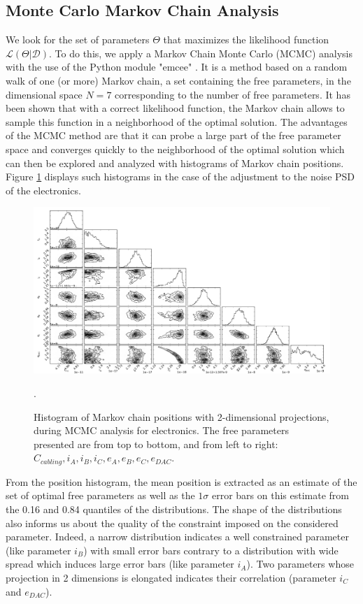 \subsection{Monte Carlo Markov Chain Analysis }
\label{par:mcmc}
\label{sec:ethem-noise}
\label{par:ethem-noise}

We look for the set of parameters $\Theta$ that maximizes the likelihood function $\mathcal{L}(\Theta | \mathcal{D})$. To do this, we apply a Markov Chain Monte Carlo (MCMC) analysis with the use of the Python module "emcee" \cite{2013PASP}.
It is a method based on a random walk of one (or more) Markov chain, a set containing the free parameters, in the dimensional space $N=7$ corresponding to the number of free parameters.
It has been shown that with a correct likelihood function, the Markov chain allows to sample this function in a neighborhood of the optimal solution. The advantages of the MCMC method are that it can probe a large part of the free parameter space and converges quickly to the neighborhood of the optimal solution which can then be explored and analyzed with histograms of Markov chain positions. Figure \ref{fig:triangle-mcmc} displays such histograms in the case of the adjustment to the noise PSD of the \Edelweiss{} electronics.
\begin{figure}
\includegraphics [width=\textwidth]{Figures/Ethem/triangle_fin.pdf}
\caption{Histogram of Markov chain positions with 2-dimensional projections, during MCMC analysis for \Edelweiss{} electronics. The free parameters presented are from top to bottom, and from left to right: $C_{cabling}, i_A, i_B, i_C, e_A, e_B, e_C, e_{DAC}$.}.
\label{fig:triangle-mcmc}
\end{figure}
From the position histogram, the mean position is extracted as an estimate of the set of optimal free parameters as well as the $1\sigma$ error bars on this estimate from the 0.16 and 0.84 quantiles of the distributions. The shape of the distributions also informs us about the quality of the constraint imposed on the considered parameter. Indeed, a narrow distribution indicates a well constrained parameter (like parameter $i_B$) with small error bars contrary to a distribution with wide spread which induces large error bars (like parameter $i_A$). Two parameters whose projection in 2 dimensions is elongated indicates their correlation (parameter $i_C$ and $e_{DAC}$).

